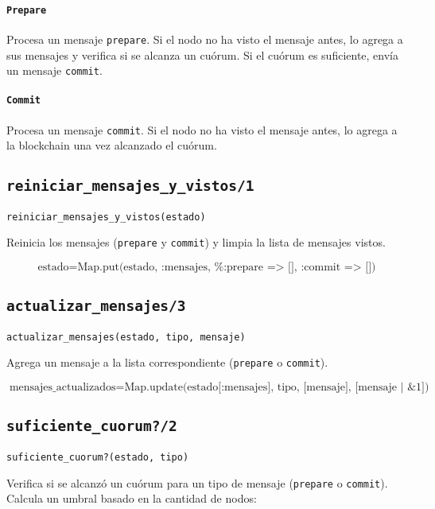 {\paragraph{\texttt{Prepare}}
Procesa un mensaje \texttt{prepare}. Si el nodo no ha visto el mensaje antes, lo agrega a sus mensajes y verifica si se alcanza un cuórum. Si el cuórum es suficiente, envía un mensaje \texttt{commit}.

\paragraph{\texttt{Commit}}
Procesa un mensaje \texttt{commit}. Si el nodo no ha visto el mensaje antes, lo agrega a la blockchain una vez alcanzado el cuórum.

\subsection*{\texttt{reiniciar\_mensajes\_y\_vistos/1}}
\begin{verbatim}
reiniciar_mensajes_y_vistos(estado)
\end{verbatim}

Reinicia los mensajes (\texttt{prepare} y \texttt{commit}) y limpia la lista de mensajes vistos.

\[
\text{estado} = \text{Map.put(estado, :mensajes, \%{:prepare => [], :commit => []})}
\]

\subsection*{\texttt{actualizar\_mensajes/3}}
\begin{verbatim}
actualizar_mensajes(estado, tipo, mensaje)
\end{verbatim}

Agrega un mensaje a la lista correspondiente (\texttt{prepare} o \texttt{commit}).

\[
\text{mensajes\_actualizados} = \text{Map.update(estado[:mensajes], tipo, [mensaje], {[mensaje | \&1]})}
\]

\subsection*{\texttt{suficiente\_cuorum?/2}}
\begin{verbatim}
suficiente_cuorum?(estado, tipo)
\end{verbatim}

Verifica si se alcanzó un cuórum para un tipo de mensaje (\texttt{prepare} o \texttt{commit}). Calcula un umbral basado en la cantidad de nodos:

}

